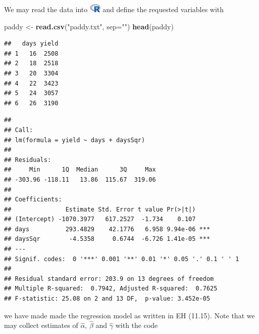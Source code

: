 \documentclass[
]{article}
\newenvironment{Shaded}{\begin{snugshade}}{\end{snugshade}}
\newcommand{\DataTypeTok}[1]{\textcolor[rgb]{0.13,0.29,0.53}{#1}}
\newcommand{\DecValTok}[1]{\textcolor[rgb]{0.00,0.00,0.81}{#1}}
\newcommand{\KeywordTok}[1]{\textcolor[rgb]{0.13,0.29,0.53}{\textbf{#1}}}
\newcommand{\NormalTok}[1]{#1}
\newcommand{\OperatorTok}[1]{\textcolor[rgb]{0.81,0.36,0.00}{\textbf{#1}}}
\newcommand{\StringTok}[1]{\textcolor[rgb]{0.31,0.60,0.02}{#1}}
\begin{document}
We may read the data into
\includegraphics[width=\textwidth,height=0.16667in]{R_logo.png} and
define the requested variables with

\begin{Shaded}
\begin{Highlighting}[]
\NormalTok{paddy <-}\StringTok{ }\KeywordTok{read.csv}\NormalTok{(}\StringTok{"paddy.txt"}\NormalTok{, }\DataTypeTok{sep=}\StringTok{""}\NormalTok{) }
\KeywordTok{head}\NormalTok{(paddy)}
\end{Highlighting}
\end{Shaded}

\begin{verbatim}
##   days yield
## 1   16  2508
## 2   18  2518
## 3   20  3304
## 4   22  3423
## 5   24  3057
## 6   26  3190
\end{verbatim}

\begin{Shaded}
\end{Shaded}

\begin{verbatim}
## 
## Call:
## lm(formula = yield ~ days + daysSqr)
## 
## Residuals:
##     Min      1Q  Median      3Q     Max 
## -303.96 -118.11   13.86  115.67  319.06 
## 
## Coefficients:
##               Estimate Std. Error t value Pr(>|t|)    
## (Intercept) -1070.3977   617.2527  -1.734    0.107    
## days          293.4829    42.1776   6.958 9.94e-06 ***
## daysSqr        -4.5358     0.6744  -6.726 1.41e-05 ***
## ---
## Signif. codes:  0 '***' 0.001 '**' 0.01 '*' 0.05 '.' 0.1 ' ' 1
## 
## Residual standard error: 203.9 on 13 degrees of freedom
## Multiple R-squared:  0.7942, Adjusted R-squared:  0.7625 
## F-statistic: 25.08 on 2 and 13 DF,  p-value: 3.452e-05
\end{verbatim}

we have made made the regression model as written in EH (11.15). Note
that we may collect estimates of \(\hat\alpha,\,\hat\beta\) and
\(\hat\gamma\) with the code
\end{document}
